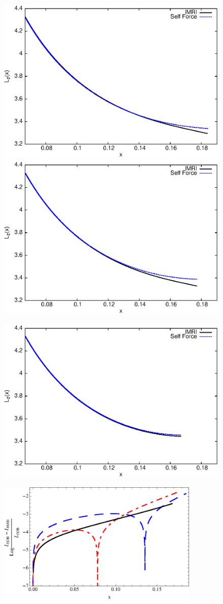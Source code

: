 \begin{figure}[ht]
\centerline{
\includegraphics[height=0.38\textwidth,  clip]{figures/insimri/lz17100invbold}
\includegraphics[height=0.38\textwidth,  clip]{figures/insimri/lz10100invbold}
}
\centerline{
\includegraphics[height=0.38\textwidth,  clip]{figures/insimri/lz1100invbold}
\includegraphics[height=2.6in, width=3.8in,  clip]{figures/insimri/angmomacc}
}

\end{figure}
